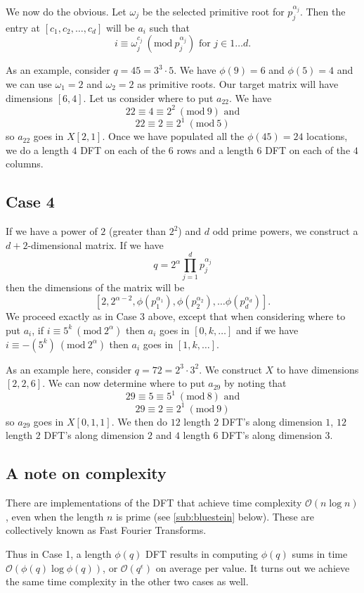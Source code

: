 \documentclass[12pt]{amsart}
\newcommand{\Mod}[1]{\ (\mathrm{mod}\ #1)}
\theoremstyle{remark}
\numberwithin{theorem}{section}
\numberwithin{equation}{section}
\begin{document}
We now do the obvious. Let $\omega_j$ be the selected primitive root for $p_j^{\alpha_j}$. Then the entry at $[c_1,c_2,\ldots,c_d]$ will be $a_i$ such that
$$
i \equiv\omega_j^{c_j}\Mod {p_j^{\alpha_j}}\textrm{ for }j\in{1\ldots d}.
$$

As an example, consider $q=45=3^3\cdot 5$. We have $\phi(9)=6$ and $\phi(5)=4$ and we can use $\omega_1=2$ and $\omega_2=2$ as primitive roots. Our target matrix will have dimensions $[6,4]$. Let us consider where to put $a_{22}$. We have
$$
22\equiv 4 \equiv 2^2\Mod{9}\textrm{ and}
$$
$$
22\equiv 2 \equiv 2^1\Mod{5}
$$
so $a_{22}$ goes in $X[2,1]$. Once we have populated all the $\phi(45)=24$ locations, we do a length $4$ DFT on each of the $6$ rows and a length $6$ DFT on each of the $4$ columns. 

\subsection{Case 4}

If we have a power of $2$ (greater than $2^2$) and $d$ odd prime powers, we construct a $d+2$-dimensional matrix.
If we have
$$
q=2^\alpha\prod_{j=1}^dp_j^{\alpha_j}
$$
then the dimensions of the matrix will be
$$
[2,2^{\alpha-2},\phi(p_1^{\alpha_1}),\phi(p_2^{\alpha_2}),\ldots\phi(p_d^{\alpha_d})].
$$
We proceed exactly as in Case 3 above, except that when considering where to put $a_i$, if $i\equiv 5^k\Mod{2^\alpha}$ then $a_i$ goes in $[0,k,\ldots]$ and if we have $i\equiv -(5^k)\Mod{2^\alpha}$ then $a_i$ goes in $[1,k,\ldots]$.

As an example here, consider $q=72=2^3\cdot3^2$. We construct $X$ to have dimensions $[2,2,6]$. We can now determine where to put $a_{29}$ by noting that
$$
29\equiv 5 \equiv 5^1 \Mod{8}\textrm{ and}
$$
$$
29\equiv 2 \equiv 2^1 \Mod{9}
$$
so $a_{29}$ goes in $X[0,1,1]$. We then do $12$ length $2$ DFT's along dimension $1$, $12$ length $2$ DFT's along dimension $2$ and $4$ length $6$ DFT's along dimension $3$.

\subsection{A note on complexity}

There are implementations of the DFT that achieve time complexity $\mathcal{O}(n\log n)$, even when the length $n$ is prime (see \ref{sub:bluestein} below). These are collectively known as Fast Fourier Transforms.

Thus in Case 1, a length $\phi(q)$ DFT results in computing $\phi(q)$ sums in time $\mathcal{O}(\phi(q)\log\phi(q))$, or $\mathcal{O}(q^\epsilon)$ on average per value. It turns out we achieve the same time complexity in the other two cases as well.
\end{document}
